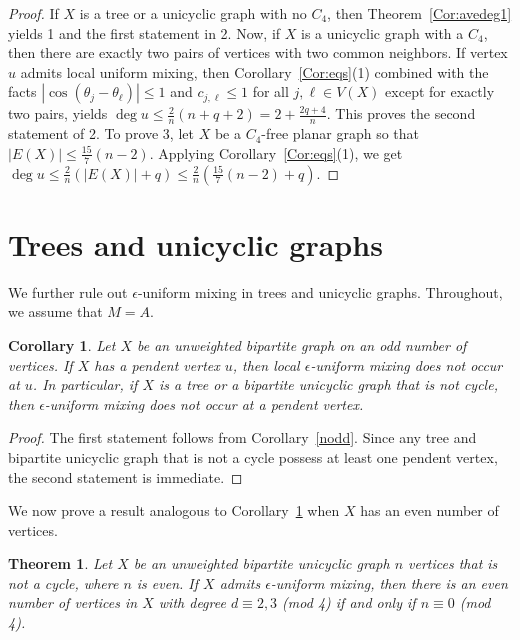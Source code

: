 \documentclass[11pt]{article}
\newtheorem{theorem}{Theorem}
\newtheorem{corollary}{Corollary}
\begin{document}
\begin{proof}
If $X$ is a tree or a unicyclic graph with no $C_4$, then Theorem~\ref{Cor:avedeg1} yields 1 and the first statement in 2. Now, if $X$ is a unicyclic graph with a $C_4$, then there are exactly two pairs of vertices with two common neighbors. If vertex $u$ admits local uniform mixing, then Corollary~\ref{Cor:eqs}(1) combined with the facts $|\cos(\theta_j-\theta_{\ell})|\leq 1$ and $c_{j,\ell}\leq 1$ for all $j,\ell\in V(X)$ except for exactly two pairs, yields $\operatorname{deg}u\leq \frac{2}{n}(n+q+2)=2+\frac{2q+4}{n}$. This proves the second statement of 2. To prove 3, let $X$ be a $C_4$-free planar graph so that $|E(X)|\leq \frac{15}{7}(n-2)$. Applying Corollary~\ref{Cor:eqs}(1), we get $\operatorname{deg}u\leq \frac{2}{n}\left(|E(X)|+q\right)\leq \frac{2}{n}\left(\frac{15}{7}(n-2)+q\right)$.
\end{proof}



\section{Trees and unicyclic graphs}\label{sec:tu}

We further rule out $\epsilon$-uniform mixing in trees and unicyclic graphs. Throughout, we assume that $M=A$.

\begin{corollary}
\label{treeuni}
Let $X$ be an unweighted bipartite graph on an odd number of vertices. If $X$ has a pendent vertex $u$, then local $\epsilon$-uniform mixing does not occur  at $u$. In particular, if $X$ is a tree or a bipartite unicyclic graph that is not cycle, then $\epsilon$-uniform mixing does not occur at a pendent vertex.
\end{corollary}

\begin{proof}
The first statement follows from Corollary~\ref{nodd}. Since any tree and bipartite unicyclic graph that is not a cycle possess at least one pendent vertex, the second statement is immediate.
\end{proof}

We now prove a result analogous to Corollary~\ref{treeuni} when $X$ has an even number of vertices.

\begin{theorem}
\label{unic1}
Let $X$ be an unweighted bipartite unicyclic graph $n$ vertices that is not a cycle, where $n$ is even. If $X$ admits $\epsilon$-uniform mixing, then there is an even number of vertices in $X$ with degree $d\equiv 2,3$ (mod 4) if and only if $n\equiv 0$ (mod 4).
\end{theorem}
\end{document}
